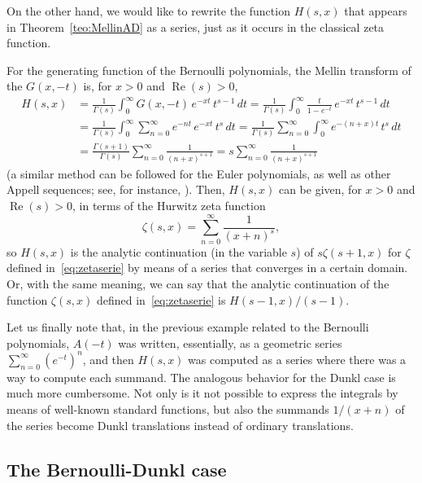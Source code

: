\documentclass[a4paper]{amsart}
\renewcommand{\Re}{\operatorname{Re}}
\theoremstyle{plain}
\theoremstyle{definition}
\theoremstyle{remark}
\numberwithin{equation}{section}
\begin{document}
On the other hand, we would like to rewrite the function $H(s,x)$ that appears in Theorem~\ref{teo:MellinAD} as a series, just as it occurs in the classical zeta function.

For the generating function of the Bernoulli polynomials, the Mellin transform of the $G(x,-t)$ is, for $x>0$ and $\Re(s)>0$,
\begin{equation}
\label{eq:trickGeo}
\begin{aligned}
  H(s,x) &= \frac{1}{\Gamma(s)} \int_{0}^{\infty} G(x,-t)\,e^{-xt}\,t^{s-1}\,dt 
  = \frac{1}{\Gamma(s)} \int_{0}^{\infty} \frac{t}{1-e^{-t}}\,e^{-xt}\,t^{s-1}\,dt 
  \\
  &= \frac{1}{\Gamma(s)} \int_{0}^{\infty} \sum_{n=0}^\infty e^{-nt} \,e^{-xt}\,t^{s}\,dt
  = \frac{1}{\Gamma(s)} \sum_{n=0}^\infty \int_{0}^{\infty} e^{-(n + x)t}\,t^{s}\,dt
  \\
  &= \frac{\Gamma(s+1)}{\Gamma(s)} \sum_{n=0}^\infty \frac{1}{(n + x)^{s+1}}
  = s \sum_{n=0}^\infty \frac{1}{(n + x)^{s+1}}
\end{aligned}
\end{equation}
(a similar method can be followed for the Euler polynomials, as well as other Appell sequences; see, for instance, \cite{NRV-2018}).
Then, $H(s,x)$ can be given, for $x>0$ and $\Re(s)>0$, in terms of the Hurwitz zeta function
\begin{equation}
\label{eq:zetaserie}
\zeta(s,x) = \sum_{n=0}^{\infty} \frac{1}{(x+n)^{s}},
\end{equation}
so $H(s,x)$ is the analytic continuation (in the variable $s$) of $s\zeta(s+1,x)$ for $\zeta$ defined in~\eqref{eq:zetaserie} by means of a series that converges in a certain domain. Or, with the same meaning, we can say that the analytic continuation of the function $\zeta(s,x)$ defined in~\eqref{eq:zetaserie} is $H(s-1,x)/(s-1)$. 

Let us finally note that, in the previous example related to the Bernoulli polynomials, 
$A(-t)$ was written, essentially, as a geometric series 
$\sum_{n=0}^{\infty} {(e^{-t})}^n$, and then $H(s,x)$ was computed as 
a series where there was a way to compute each summand.
The analogous behavior for the Dunkl case is much more cumbersome. 
Not only is it not possible to express the integrals by means of well-known standard functions, but also the summands $1/(x+n)$ of the series become Dunkl translations instead of ordinary translations. 

\subsection{The Bernoulli-Dunkl case}
\label{subsec:BD}
\end{document}
